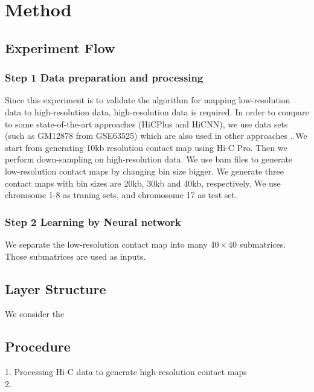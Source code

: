 \section{Method}
\subsection{Experiment Flow}
\subsubsection*{Step 1 Data preparation and processing}
Since this experiment is to validate the algorithm for mapping low-resolution data to high-resolution data, high-resolution data is required. In order to compare to some state-of-the-art approaches (HiCPlus and HiCNN), we use data sets (such as GM12878 from GSE63525) which are also used in other approaches . We start from generating 10kb resolution contact map using Hi-C Pro. Then we perform down-sampling on high-resolution data. We use bam files to generate low-resolution contact maps by changing bin size bigger. We generate three contact maps with bin sizes are 20kb, 30kb and 40kb, respectively. We use chromsome 1-8 as traning sets, and chromosome 17 as test set.
\subsubsection*{Step 2 Learning by Neural network}
We separate the low-resolution contact map into many $40 \times 40$ submatrices. Those submatrices are used as inputs.
\subsection{Layer Structure}
We consider the 


\subsection{Procedure}
1. Processing Hi-C data to generate high-resolution contact maps\\
2. 